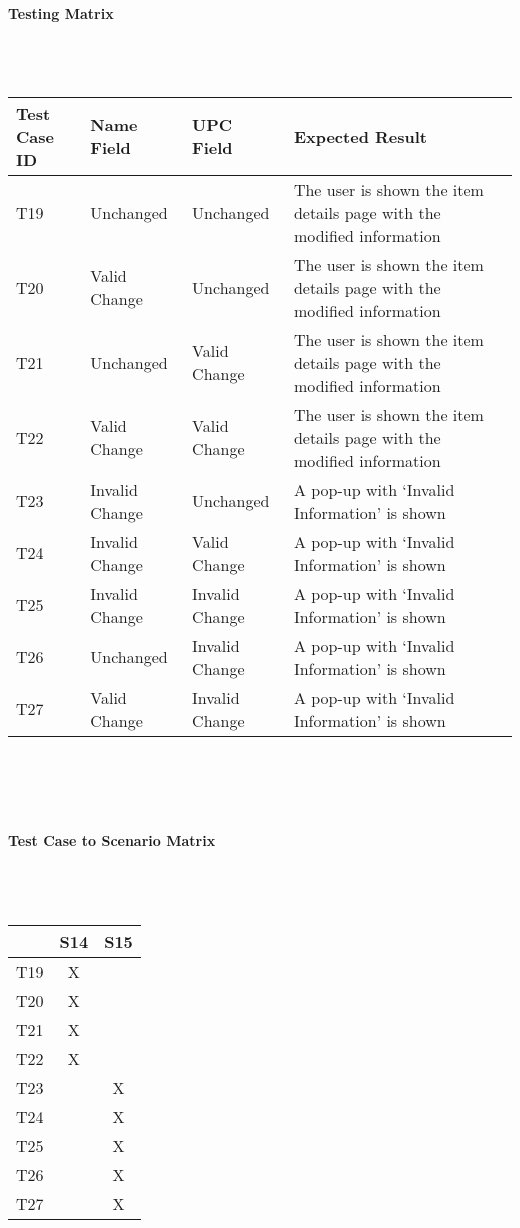 \documentclass{article}
\begin{document}
\paragraph{Testing Matrix}~\\ \\
\begin{tabular}{ p{0.8in}  p{0.9in}  p{0.9in}  p{2.8in}}
\hline
Test Case ID & Name Field & UPC Field & Expected Result\\
\hline
\hline
T19 & Unchanged & Unchanged & The user is shown the item details page with the modified information\\
\hline
T20 & Valid Change & Unchanged & The user is shown the item details page with the modified information\\
\hline
T21 & Unchanged & Valid Change & The user is shown the item details page with the modified information\\
\hline
T22 & Valid Change & Valid Change & The user is shown the item details page with the modified information\\
\hline
T23 & Invalid Change & Unchanged & A pop-up with `Invalid Information' is shown\\
\hline
T24 & Invalid Change & Valid Change & A pop-up with `Invalid Information' is shown\\
\hline
T25 & Invalid Change & Invalid Change & A pop-up with `Invalid Information' is shown\\
\hline
T26 & Unchanged & Invalid Change & A pop-up with `Invalid Information' is shown\\
\hline
T27 & Valid Change & Invalid Change & A pop-up with `Invalid Information' is shown\\
\hline
\end{tabular}\\
~\\
~\\
\paragraph{Test Case to Scenario Matrix}~\\ \\
\begin{tabular}{ | c || c | c | }
\hline
    & S14 & S15 \\
\hline
\hline
T19 &  X  &     \\
\hline
T20 &  X  &     \\
\hline
T21 &  X  &     \\
\hline
T22 &  X  &     \\
\hline
T23 &     &  X  \\
\hline
T24 &     &  X  \\
\hline
T25 &     &  X  \\
\hline
T26 &     &  X  \\
\hline
T27 &     &  X  \\
\hline
\end{tabular}
\end{document}
